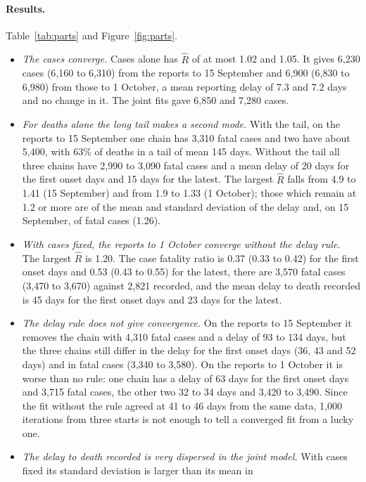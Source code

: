 \documentclass[11pt,a4paper]{article}
\begin{document}
\paragraph{Results.} Table~\ref{tab:parts} and Figure~\ref{fig:parts}.
\begin{itemize}
\item \emph{The cases converge.} Cases alone has $\hat{R}$ of at most 1.02
and 1.05. It gives 6{,}230 cases (6{,}160 to 6{,}310) from the reports to 15
September and 6{,}900 (6{,}830 to 6{,}980) from those to 1 October, a mean
reporting delay of 7.3 and 7.2 days and no change in it. The joint fits
gave 6{,}850 and 7{,}280 cases.
\item \emph{For deaths alone the long tail makes a second mode.} With the
tail, on the reports to 15 September one chain has 3{,}310 fatal cases and
two have about 5{,}400, with 63\% of deaths in a tail of mean 145 days.
Without the tail all three chains have 2{,}990 to 3{,}090 fatal cases and a
mean delay of 20 days for the first onset days and 15 days for the latest.
The largest $\hat{R}$ falls from 4.9 to 1.41 (15 September) and from 1.9
to 1.33 (1 October); those which remain at 1.2 or more are of the mean and
standard deviation of the delay and, on 15 September, of fatal cases (1.26).
\item \emph{With cases fixed, the reports to 1 October converge without the
delay rule.} The largest $\hat{R}$ is 1.20. The case fatality ratio is 0.37
(0.33 to 0.42) for the first onset days and 0.53 (0.43 to 0.55) for the
latest, there are 3{,}570 fatal cases (3{,}470 to 3{,}670) against 2{,}821
recorded, and the mean delay to death recorded is 45 days for the first
onset days and 23 days for the latest.
\item \emph{The delay rule does not give convergence.} On the reports to 15
September it removes the chain with 4{,}310 fatal cases and a delay of 93
to 134 days, but the three chains still differ in the delay for the first
onset days (36, 43 and 52 days) and in fatal cases (3{,}340 to 3{,}580). On
the reports to 1 October it is worse than no rule: one chain has a delay of
63 days for the first onset days and 3{,}715 fatal cases, the other two 32
to 34 days and 3{,}420 to 3{,}490. Since the fit without the rule agreed at
41 to 46 days from the same data, 1{,}000 iterations from three starts is
not enough to tell a converged fit from a lucky one.
\item \emph{The delay to death recorded is very dispersed in the joint
model.} With cases fixed its standard deviation is larger than its mean in

\end{itemize}
\end{document}
